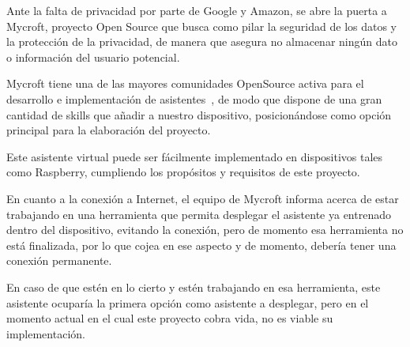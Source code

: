 Ante la falta de privacidad por parte de Google y Amazon, se abre la puerta a Mycroft, proyecto Open Source que busca como pilar la seguridad de los datos y la protección de la privacidad, de manera que asegura no almacenar ningún dato o información del usuario potencial.~\cite{mycroft-doc}

Mycroft tiene una de las mayores comunidades OpenSource activa para el desarrollo e implementación de asistentes~\cite{mycroft-com}, de modo que dispone de una gran cantidad de skills que añadir a nuestro dispositivo, posicionándose como opción principal para la elaboración del proyecto.

Este asistente virtual puede ser fácilmente implementado en dispositivos tales como Raspberry, cumpliendo los propósitos y requisitos de este proyecto.

En cuanto a la conexión a Internet, el equipo de Mycroft informa acerca de estar trabajando en una herramienta que permita desplegar el asistente ya entrenado dentro del dispositivo, evitando la conexión, pero de momento esa herramienta no está finalizada, por lo que cojea en ese aspecto y de momento, debería tener una conexión permanente.

En caso de que estén en lo cierto y estén trabajando en esa herramienta, este asistente ocuparía la primera opción como asistente a desplegar, pero en el momento actual en el cual este proyecto cobra vida, no es viable su implementación.


